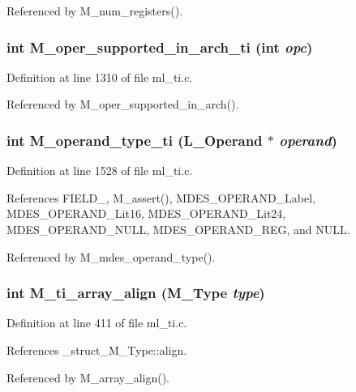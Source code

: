 Referenced by M\_\-num\_\-registers().
\subsubsection{\setlength{\rightskip}{0pt plus 5cm}int M\_\-oper\_\-supported\_\-in\_\-arch\_\-ti (int {\em opc})}\label{ml__ti_8c_63f22360123194536bc972d29360084c}




Definition at line 1310 of file ml\_\-ti.c.

Referenced by M\_\-oper\_\-supported\_\-in\_\-arch().
\subsubsection{\setlength{\rightskip}{0pt plus 5cm}int M\_\-operand\_\-type\_\-ti (L\_\-Operand $\ast$ {\em operand})}\label{ml__ti_8c_f9b61d1bc511d8028dffc27b75ba4cf7}




Definition at line 1528 of file ml\_\-ti.c.

References FIELD\_, M\_\-assert(), MDES\_\-OPERAND\_\-Label, MDES\_\-OPERAND\_\-Lit16, MDES\_\-OPERAND\_\-Lit24, MDES\_\-OPERAND\_\-NULL, MDES\_\-OPERAND\_\-REG, and NULL.

Referenced by M\_\-mdes\_\-operand\_\-type().
\subsubsection{\setlength{\rightskip}{0pt plus 5cm}int M\_\-ti\_\-array\_\-align (\bf{M\_\-Type} {\em type})}\label{ml__ti_8c_4e70504bb940f8768cb2441101ef07f1}




Definition at line 411 of file ml\_\-ti.c.

References \_\-struct\_\-M\_\-Type::align.

Referenced by M\_\-array\_\-align().
